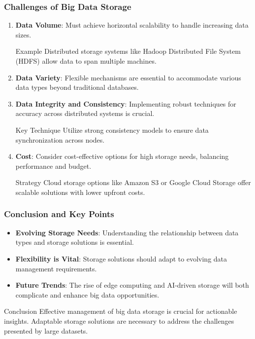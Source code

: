 \documentclass[aspectratio=169]{beamer}
\begin{document}
\begin{frame}[fragile]
    \frametitle{Challenges of Big Data Storage}
    \begin{enumerate}
        \item \textbf{Data Volume}: Must achieve horizontal scalability to handle increasing data sizes.
            \begin{block}{Example}
                Distributed storage systems like Hadoop Distributed File System (HDFS) allow data to span multiple machines.
            \end{block}
        \item \textbf{Data Variety}: Flexible mechanisms are essential to accommodate various data types beyond traditional databases.
        \item \textbf{Data Integrity and Consistency}: Implementing robust techniques for accuracy across distributed systems is crucial.
            \begin{block}{Key Technique}
                Utilize strong consistency models to ensure data synchronization across nodes.
            \end{block}
        \item \textbf{Cost}: Consider cost-effective options for high storage needs, balancing performance and budget.
            \begin{block}{Strategy}
                Cloud storage options like Amazon S3 or Google Cloud Storage offer scalable solutions with lower upfront costs.
            \end{block}
    \end{enumerate}
\end{frame}

\begin{frame}[fragile]
    \frametitle{Conclusion and Key Points}
    \begin{itemize}
        \item \textbf{Evolving Storage Needs}: Understanding the relationship between data types and storage solutions is essential.
        \item \textbf{Flexibility is Vital}: Storage solutions should adapt to evolving data management requirements.
        \item \textbf{Future Trends}: The rise of edge computing and AI-driven storage will both complicate and enhance big data opportunities.
    \end{itemize}
    
    \begin{block}{Conclusion}
        Effective management of big data storage is crucial for actionable insights. Adaptable storage solutions are necessary to address the challenges presented by large datasets.
    \end{block}
\end{frame}
\end{document}
